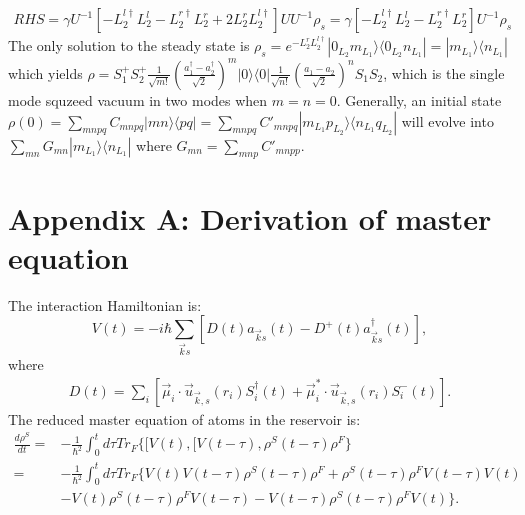 \documentclass{article}
\begin{document}
\begin{equation}
\label{eq18}
\begin{split}
RHS=\gamma U^{-1}[-L_2^{l\dagger}L_2^{l}-L_2^{r\dagger}L_2^{r}+2L_2^{r}L_2^{l\dagger}]UU^{-1}\rho_{s}=\gamma[-L_2^{l\dagger}L_2^{l}-L_2^{r\dagger}L_2^{r}]U^{-1}\rho_{s}
\end{split}
\end{equation}
The only solution to the steady state is $\rho_{s}=e^{-L_{2}^{r}L_{2}^{l\dagger}}|0_{L_{2}}m_{L_{1}}\rangle\langle0_{L_{2}}n_{L_{1}}|=|m_{L_{1}}\rangle\langle n_{L_{1}}|$ which yields $\rho=S_{1}^{+}S_{2}^{+}\frac{1}{\sqrt{m!}}(\frac{a_{1}^{\dagger}-a_{2}^{\dagger}}{\sqrt{2}})^{m}|0\rangle\langle0|\frac{1}{\sqrt{n!}}(\frac{a_{1}-a_{2}}{\sqrt{2}})^{n}S_{1}S_{2}$, which is the single mode squzeed vacuum in two modes when $m=n=0$. Generally, an initial state $\rho(0)=\sum_{mnpq}C_{mnpq}|mn\rangle\langle pq|=\sum_{mnpq}C'_{mnpq}|m_{L_{1}}p_{L_{2}}\rangle\langle n_{L_{1}}q_{L_{2}}|$ will evolve into $\sum_{mn}G_{mn}|m_{L_{1}}\rangle\langle n_{L_{1}}|$ where $G_{mn}=\sum_{mnp}C'_{mnpp}$.

\appendix

\section{Appendix A: Derivation of master equation}
The interaction Hamiltonian is:
\begin{equation}
\label{eqa0}\tag{A1}
V(t)=-i\hbar \sum_{\vec{k}s}[D(t)a_{\vec{k}s}(t)-D^{+}(t)a^{\dagger}_{\vec{k}s}(t)],
\end{equation}
where
\begin{equation}
\label{eqa1}\tag{A2}
\begin{gathered}
 D(t)=\underset{i}{\sum}[\vec{\mu}_{i}\cdot\vec{u}_{\vec{k},s}(r_{i})S_{i}^{\dagger}(t)+\vec{\mu}^{*}_{i}\cdot\vec{u}_{\vec{k},s}(r_{i})S_{i}^{-}(t)]. 
 \end{gathered}
\end{equation}
The reduced master equation of atoms in the reservoir is:
\begin{equation}
\label{eqa2}\tag{A3}
\begin{split}
\frac{d\rho^{S}}{dt}=&-\frac{1}{\hbar^{2}}\int_{0}^{t}d\tau Tr_{F}\{[V(t),[V(t-\tau),\rho^{S}(t-\tau)\rho^{F}\}\\
=&-\frac{1}{\hbar^{2}}\int_{0}^{t}d\tau Tr_{F}\{V(t)V(t-\tau)\rho^{S}(t-\tau)\rho^{F}+\rho^{S}(t-\tau)\rho^{F}V(t-\tau)V(t)\\
&-V(t)\rho^{S}(t-\tau)\rho^{F}V(t-\tau)-V(t-\tau)\rho^{S}(t-\tau)\rho^{F}V(t)\}.
\end{split}
\end{equation} 
\end{document}
